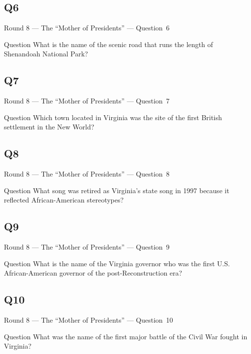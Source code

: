 \documentclass[11pt]{beamer}
\begin{document}
\subsection*{Q6}
\begin{frame}[t]{Round 8 --- The ``Mother of Presidents'' --- \mbox{Question 6}}
\vspace{-0.5em}
\begin{block}{Question}
What is the name of the scenic road that runs the length of Shenandoah National Park?
\end{block}
\end{frame}
\subsection*{Q7}
\begin{frame}[t]{Round 8 --- The ``Mother of Presidents'' --- \mbox{Question 7}}
\vspace{-0.5em}
\begin{block}{Question}
Which town located in Virginia was the site of the first British settlement in the New World?
\end{block}
\end{frame}
\subsection*{Q8}
\begin{frame}[t]{Round 8 --- The ``Mother of Presidents'' --- \mbox{Question 8}}
\vspace{-0.5em}
\begin{block}{Question}
What song was retired as Virginia's state song in 1997 because it reflected African-American stereotypes?
\end{block}
\end{frame}
\subsection*{Q9}
\begin{frame}[t]{Round 8 --- The ``Mother of Presidents'' --- \mbox{Question 9}}
\vspace{-0.5em}
\begin{block}{Question}
What is the name of the Virginia governor who was the first U.S. African-American governor of the post-Reconstruction era?
\end{block}
\end{frame}
\subsection*{Q10}
\begin{frame}[t]{Round 8 --- The ``Mother of Presidents'' --- \mbox{Question 10}}
\vspace{-0.5em}
\begin{block}{Question}
What was the name of the  first major battle of the Civil War fought in Virginia?
\end{block}
\end{frame}
\end{document}

